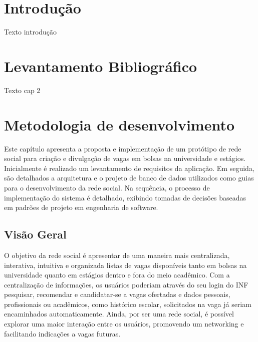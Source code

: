 \documentclass[cic,tc]{iiufrgs}
\begin{document}

\tableofcontents

\chapter{Introdução}

Texto introdução

\chapter{Levantamento Bibliográfico}

Texto cap 2

\chapter{Metodologia de desenvolvimento}
\label{cap_baseline}
Este capítulo apresenta a proposta e implementação de um protótipo de rede social para criação e divulgação de vagas em bolsas na universidade e estágios. Inicialmente é realizado um levantamento de requisitos da aplicação. Em seguida, são detalhados a arquitetura e o projeto de banco de dados utilizados como guias para o desenvolvimento da rede social. Na sequência, o processo de implementação do sistema é detalhado, exibindo tomadas de decisões baseadas em padrões de projeto em engenharia de software.

\section{Visão Geral}
O objetivo da rede social é apresentar de uma maneira mais centralizada, interativa, intuitiva e organizada listas de vagas disponíveis tanto em bolsas na universidade quanto em estágios dentro e fora do meio acadêmico. Com a centralização de informações, os usuários poderiam através do seu login do INF pesquisar, recomendar e candidatar-se a vagas ofertadas e dados pessoais, profissionais ou acadêmicos, como histórico escolar, solicitados na vaga já seriam encaminhados automaticamente. Ainda, por ser uma rede social, é possível explorar uma maior interação entre os usuários, promovendo um networking e facilitando indicações a vagas futuras.
\end{document}
